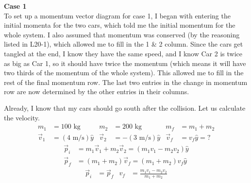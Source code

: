 \documentclass[]{article}
\begin{document}
\newpage
\begin{TeacherMargin}
\noindent\textbf{Case 1} \\
To set up a momentum vector diagram for case 1, I began with entering the initial momenta for the two cars, which told me the initial momentum for the whole system. I also assumed that momentum was conserved (by the reasoning listed in L20-1), which allowed me to fill in the 1 \& 2 column. Since the cars get tangled at the end, I know they have the same speed, and I know Car 2 is twice as big as Car 1, so it should have twice the momentum (which means it will have two thirds of the momentum of the whole system). This allowed me to fill in the rest of the final momentum row. The last two entries in the change in momentum row are now determined by the other entries in their columns.
\begin{center}
	\Large
\end{center}
Already, I know that my cars should go south after the collision. Let us calculate the velocity.
\begin{align*}
	m_{1} & = 100\text{ kg} & m_{2} & = 200\text{ kg} & m_{f} & = m_{1}+m_{2} \\
	\vec{v}_{1} & = (4\text{ m/s})\hat{y} & \vec{v}_{2} & = -(3\text{ m/s})\hat{y} & \vec{v}_{f} & = v_{f}\hat{y} = ?
\end{align*}
\begin{align*}
	\vec{p}_{i} & = m_{1}\vec{v}_{1} + m_{2}\vec{v}_{2} = (m_{1}v_{1}-m_{2}v_{2})\hat{y} \\
	\vec{p}_{f} & = (m_{1} + m_{2})\vec{v}_{f} = (m_{1}+m_{2})v_{f}\hat{y}
\end{align*}
\begin{align*}
	\vec{p}_{i} & = \vec{p}_{f} & v_{f} & = \frac{m_{1}v_{1}-m_{2}v_{2}}{m_{1}+m_{2}} \\

\end{align*}
\end{TeacherMargin}
\end{document}
